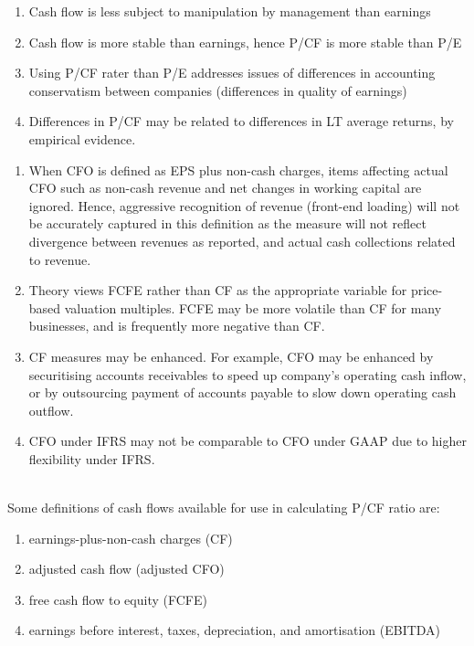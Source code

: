 \begin{remark} 
\begin{enumerate}[label=\roman*.]
\setlength{\itemsep}{0pt}
\item Cash flow is less subject to manipulation by management than earnings
\item Cash flow is more stable than earnings, hence P/CF is more stable than P/E
\item Using P/CF rater than P/E addresses issues of differences in accounting conservatism between companies (differences in quality of earnings)
\item Differences in P/CF may be related to differences in LT average returns, by empirical evidence.
\end{enumerate}
\end{remark}

\begin{remark} 
\begin{enumerate}[label=\roman*.]
\setlength{\itemsep}{0pt}
\item When CFO is defined as EPS plus non-cash charges, items affecting actual CFO such as non-cash revenue and net changes in working capital are ignored. Hence, aggressive recognition of revenue (front-end loading) will not be accurately captured in this definition as the measure will not reflect divergence between revenues as reported, and actual cash collections related to revenue.
\item Theory views FCFE rather than CF as the appropriate variable for price-based valuation multiples. FCFE may be more volatile than CF for many businesses, and is frequently more negative than CF.
\item CF measures may be enhanced. For example, CFO may be enhanced by securitising accounts receivables to speed up company's operating cash inflow, or by outsourcing payment of accounts payable to slow down operating cash outflow.
\item CFO under IFRS may not be comparable to CFO under GAAP due to higher flexibility under IFRS.
\end{enumerate}
\end{remark}

\begin{method} \\
Some definitions of cash flows available for use in calculating P/CF ratio are:
\begin{enumerate}[label=\roman*.]
\setlength{\itemsep}{0pt}
\item earnings-plus-non-cash charges (CF)
\item adjusted cash flow (adjusted CFO)
\item free cash flow to equity (FCFE)
\item earnings before interest, taxes, depreciation, and amortisation (EBITDA)
\end{enumerate}
\end{method}

